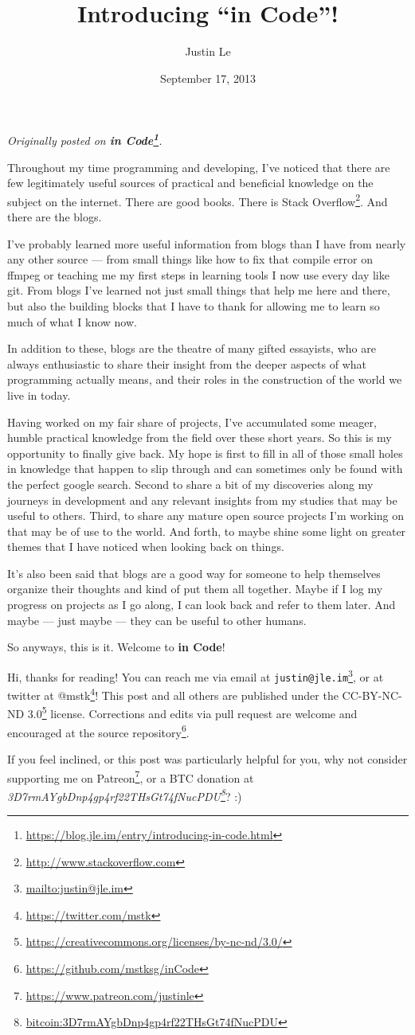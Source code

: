 \documentclass[]{article}
\title{Introducing ``in Code''!}
\author{Justin Le}
\date{September 17, 2013}
\renewcommand{\href}[2]{#2\footnote{\url{#1}}}
\begin{document}
\maketitle

\emph{Originally posted on
\textbf{\href{https://blog.jle.im/entry/introducing-in-code.html}{in Code}}.}

Throughout my time programming and developing, I've noticed that there are few
legitimately useful sources of practical and beneficial knowledge on the subject
on the internet. There are good books. There is
\href{http://www.stackoverflow.com}{Stack Overflow}. And there are the blogs.

I've probably learned more useful information from blogs than I have from nearly
any other source --- from small things like how to fix that compile error on
ffmpeg or teaching me my first steps in learning tools I now use every day like
git. From blogs I've learned not just small things that help me here and there,
but also the building blocks that I have to thank for allowing me to learn so
much of what I know now.

In addition to these, blogs are the theatre of many gifted essayists, who are
always enthusiastic to share their insight from the deeper aspects of what
programming actually means, and their roles in the construction of the world we
live in today.

Having worked on my fair share of projects, I've accumulated some meager, humble
practical knowledge from the field over these short years. So this is my
opportunity to finally give back. My hope is first to fill in all of those small
holes in knowledge that happen to slip through and can sometimes only be found
with the perfect google search. Second to share a bit of my discoveries along my
journeys in development and any relevant insights from my studies that may be
useful to others. Third, to share any mature open source projects I'm working on
that may be of use to the world. And forth, to maybe shine some light on greater
themes that I have noticed when looking back on things.

It's also been said that blogs are a good way for someone to help themselves
organize their thoughts and kind of put them all together. Maybe if I log my
progress on projects as I go along, I can look back and refer to them later. And
maybe --- just maybe --- they can be useful to other humans.

So anyways, this is it. Welcome to \textbf{in Code}!

Hi, thanks for reading! You can reach me via email at
\href{mailto:justin@jle.im}{\nolinkurl{justin@jle.im}}, or at twitter at
\href{https://twitter.com/mstk}{@mstk}! This post and all others are published
under the \href{https://creativecommons.org/licenses/by-nc-nd/3.0/}{CC-BY-NC-ND
3.0} license. Corrections and edits via pull request are welcome and encouraged
at \href{https://github.com/mstksg/inCode}{the source repository}.

If you feel inclined, or this post was particularly helpful for you, why not
consider \href{https://www.patreon.com/justinle}{supporting me on Patreon}, or a
BTC donation at
\emph{\href{bitcoin:3D7rmAYgbDnp4gp4rf22THsGt74fNucPDU}{3D7rmAYgbDnp4gp4rf22THsGt74fNucPDU}}?
:)
\end{document}
